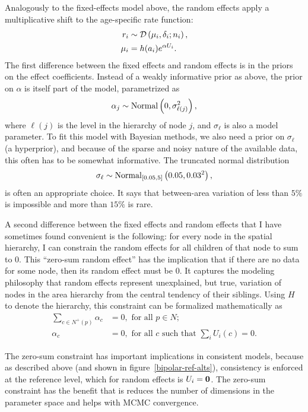 Analogously to the fixed-effects model above, the random effects apply
a multiplicative shift to the age-specific rate function:
\begin{align*}
r_i &\sim \mathcal{D}\left(\mu_i, \delta_i; n_i\right),\\
\mu_i &= h(a_i)e^{\alpha U_i}.
\end{align*}
The first difference between the fixed effects and random effects is
in the priors on the effect coefficients.  Instead of a weakly
informative prior as above, the prior on $\alpha$ is itself part of
the model, parametrized as
\[
\alpha_j \sim \operatorname{Normal}\left(0, \sigma_{\ell(j)}^2\right),
\]
where $\ell(j)$ is the level in the hierarchy of node $j$, and
$\sigma_\ell$ is also a model parameter. To fit this model with
Bayesian methods, we also need a prior on $\sigma_\ell$ (a
hyperprior), and because of the sparse and noisy nature of the
available data, this often has to be somewhat informative.  The
truncated normal distribution
\[
\sigma_\ell \sim \operatorname{Normal}_{[0.05,5]}\left(0.05, 0.03^2\right),
\]
is often an appropriate choice. It says that between-area variation of
less than $5\%$ is impossible and more than $15\%$ is rare.

A second difference between the fixed effects and random effects that
I have sometimes found convenient is
the following: for every node in the spatial hierarchy, I can
constrain the random
effects for all children of that node to sum to $0$. This ``zero-sum
random effect'' has the implication that if there
are no data for some node, then its random effect must be $0$.  It
captures the modeling philosophy that random effects represent
unexplained, but true, variation of nodes in the area hierarchy from
the central tendency of their siblings.  Using $H$ to denote the
hierarchy, this constraint can be formalized mathematically as
\begin{align*}
\sum_{c\in N^+(p)} \alpha_c &= 0, \text{ for all } p \in N;\\
\alpha_c &=0, \text{ for all $c$ such that } \sum_{i} U_i(c) = 0.
\end{align*}

The zero-sum constraint has important implications in consistent
models, because as described above (and shown in
figure~\ref{bipolar-ref-alts}), consistency is enforced at the
reference level, which for random effects is $U_i = \mathbf{0}$.  The 
zero-sum constraint has the benefit that is reduces the number 
of dimensions in the parameter space and helps with MCMC convergence.

